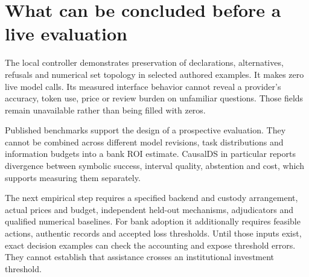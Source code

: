 \section{What can be concluded before a live evaluation}

The local controller demonstrates preservation of declarations, alternatives,
refusals and numerical set topology in selected authored examples. It makes
zero live model calls. Its measured interface behavior cannot reveal a
provider's accuracy, token use, price or review burden on unfamiliar questions.
Those fields remain unavailable rather than being filled with zeros.

Published benchmarks support the design of a prospective evaluation. They
cannot be combined across different model revisions, task distributions and
information budgets into a bank ROI estimate. CausalDS in particular reports
divergence between symbolic success, interval quality, abstention and cost,
which supports measuring them separately.\cite{v12_la_2607_08093}

The next empirical step requires a specified backend and custody arrangement,
actual prices and budget, independent held-out mechanisms, adjudicators and
qualified numerical baselines. For bank adoption it additionally requires
feasible actions, authentic records and accepted loss thresholds. Until those
inputs exist, exact decision examples can check the accounting and expose
threshold errors. They cannot establish that assistance crosses an institutional
investment threshold.

